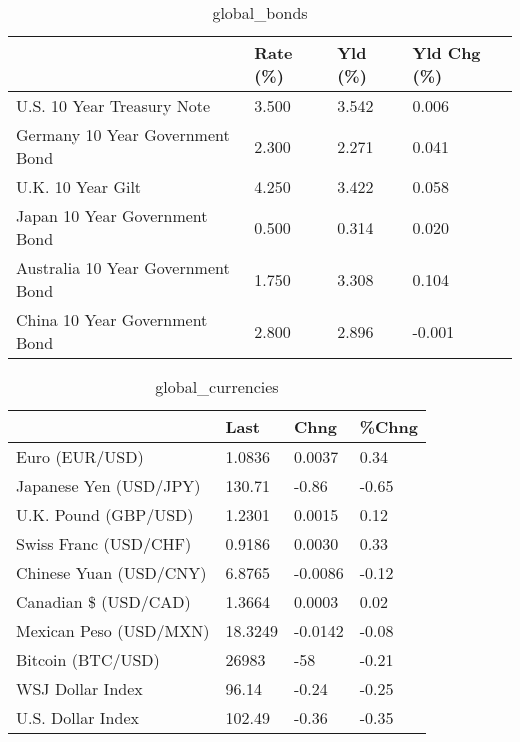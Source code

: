 \documentclass{article}%
\begin{document}
%


\begin{table}[htbp]%
\caption{global\_bonds}%
\centering%
\begin{adjustbox}{width=1\textwidth}%
\begin{tabular}{llll}
\toprule
                                  & Rate (\%) & Yld (\%) & Yld Chg (\%) \\
\midrule
       U.S. 10 Year Treasury Note &    3.500 &   3.542 &       0.006 \\
  Germany 10 Year Government Bond &    2.300 &   2.271 &       0.041 \\
                U.K. 10 Year Gilt &    4.250 &   3.422 &       0.058 \\
    Japan 10 Year Government Bond &    0.500 &   0.314 &       0.020 \\
Australia 10 Year Government Bond &    1.750 &   3.308 &       0.104 \\
    China 10 Year Government Bond &    2.800 &   2.896 &      -0.001 \\
\bottomrule
\end{tabular}
%
\end{adjustbox}%
\end{table}

%


\begin{table}[htbp]%
\caption{global\_currencies}%
\centering%
\begin{adjustbox}{width=1\textwidth}%
\begin{tabular}{llll}
\toprule
                       &    Last &    Chng & \%Chng \\
\midrule
        Euro (EUR/USD) &  1.0836 &  0.0037 &  0.34 \\
Japanese Yen (USD/JPY) &  130.71 &   -0.86 & -0.65 \\
  U.K. Pound (GBP/USD) &  1.2301 &  0.0015 &  0.12 \\
 Swiss Franc (USD/CHF) &  0.9186 &  0.0030 &  0.33 \\
Chinese Yuan (USD/CNY) &  6.8765 & -0.0086 & -0.12 \\
  Canadian \$ (USD/CAD) &  1.3664 &  0.0003 &  0.02 \\
Mexican Peso (USD/MXN) & 18.3249 & -0.0142 & -0.08 \\
     Bitcoin (BTC/USD) &   26983 &     -58 & -0.21 \\
      WSJ Dollar Index &   96.14 &   -0.24 & -0.25 \\
     U.S. Dollar Index &  102.49 &   -0.36 & -0.35 \\
\bottomrule
\end{tabular}
%
\end{adjustbox}%
\end{table}
\end{document}
